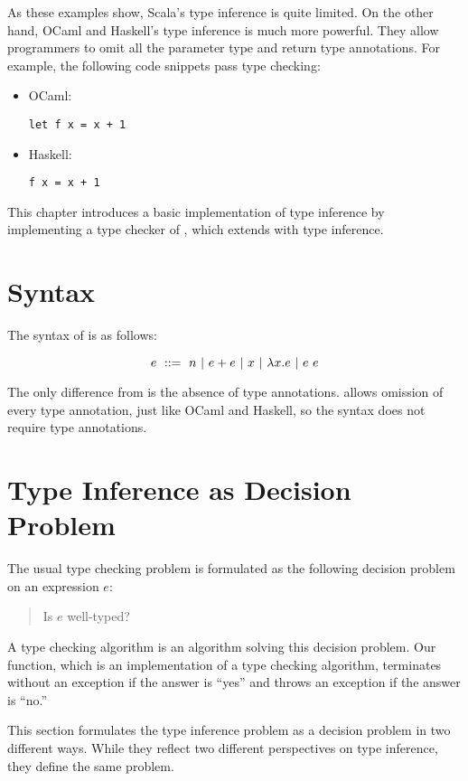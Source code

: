 As these examples show, Scala's type inference is quite limited. On the other
hand, OCaml and Haskell's type inference is much more powerful. They allow
programmers to omit all the parameter type and return type annotations. For
example, the following code snippets pass type checking:

\begin{itemize}
  \item OCaml:
    \begin{verbatim}
let f x = x + 1
    \end{verbatim}
  \item Haskell:
    \begin{verbatim}
f x = x + 1
    \end{verbatim}
\end{itemize}

This chapter introduces a basic implementation of type inference by implementing a
type checker of \Lang, which extends \plang with type inference.

\section{Syntax}

The syntax of \Lang is as follows:

\[
e\ ::=\ n
\ |\ e+e
\ |\ x
\ |\ \lambda x.e
\ |\ e\ e
\]

The only difference from \plang is the absence of type annotations. \Lang allows
omission of every type annotation, just like OCaml and Haskell, so the syntax
does not require type annotations.

\section{Type Inference as Decision Problem}

The usual type checking problem is formulated as the following decision problem
on an expression $e$:

\begin{quote}
  Is $e$ well-typed?
\end{quote}

A type checking algorithm is an algorithm solving this decision problem. Our
 function, which is an implementation of a type checking
algorithm, terminates without an exception if the answer is ``yes'' and throws
an exception if the answer is ``no.''

This section formulates the type inference problem as a decision problem in two
different ways. While they reflect two different perspectives on type
inference, they define the same problem.

